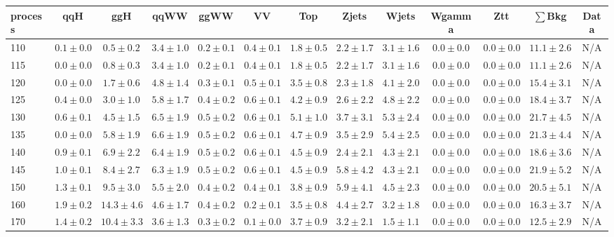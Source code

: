 \begin{table}
{%
 \tiny
 \begin{center}
 \begin{tabular}{l | c c | c c c c c c c c  | c c}
 \hline
 process & qqH & ggH & qqWW & ggWW & VV & Top & Zjets & Wjets & Wgamma & Ztt & $\sum$Bkg & Data \\
 \hline
110 & $0.1\pm0.0$ & $0.5\pm0.2$ & $3.4\pm1.0$ & $0.2\pm0.1$ & $0.4\pm0.1$ & $1.8\pm0.5$ & $2.2\pm1.7$ & $3.1\pm1.6$ & $0.0\pm0.0$ & $0.0\pm0.0$ & $11.1\pm2.6$ & N/A \\
115 & $0.0\pm0.0$ & $0.8\pm0.3$ & $3.4\pm1.0$ & $0.2\pm0.1$ & $0.4\pm0.1$ & $1.8\pm0.5$ & $2.2\pm1.7$ & $3.1\pm1.6$ & $0.0\pm0.0$ & $0.0\pm0.0$ & $11.1\pm2.6$ & N/A \\
120 & $0.0\pm0.0$ & $1.7\pm0.6$ & $4.8\pm1.4$ & $0.3\pm0.1$ & $0.5\pm0.1$ & $3.5\pm0.8$ & $2.3\pm1.8$ & $4.1\pm2.0$ & $0.0\pm0.0$ & $0.0\pm0.0$ & $15.4\pm3.1$ & N/A \\
125 & $0.4\pm0.0$ & $3.0\pm1.0$ & $5.8\pm1.7$ & $0.4\pm0.2$ & $0.6\pm0.1$ & $4.2\pm0.9$ & $2.6\pm2.2$ & $4.8\pm2.2$ & $0.0\pm0.0$ & $0.0\pm0.0$ & $18.4\pm3.7$ & N/A \\
130 & $0.6\pm0.1$ & $4.5\pm1.5$ & $6.5\pm1.9$ & $0.5\pm0.2$ & $0.6\pm0.1$ & $5.1\pm1.0$ & $3.7\pm3.1$ & $5.3\pm2.4$ & $0.0\pm0.0$ & $0.0\pm0.0$ & $21.7\pm4.5$ & N/A \\
135 & $0.0\pm0.0$ & $5.8\pm1.9$ & $6.6\pm1.9$ & $0.5\pm0.2$ & $0.6\pm0.1$ & $4.7\pm0.9$ & $3.5\pm2.9$ & $5.4\pm2.5$ & $0.0\pm0.0$ & $0.0\pm0.0$ & $21.3\pm4.4$ & N/A \\
140 & $0.9\pm0.1$ & $6.9\pm2.2$ & $6.4\pm1.9$ & $0.5\pm0.2$ & $0.6\pm0.1$ & $4.5\pm0.9$ & $2.4\pm2.1$ & $4.3\pm2.1$ & $0.0\pm0.0$ & $0.0\pm0.0$ & $18.6\pm3.6$ & N/A \\
145 & $1.0\pm0.1$ & $8.4\pm2.7$ & $6.3\pm1.9$ & $0.5\pm0.2$ & $0.6\pm0.1$ & $4.5\pm0.9$ & $5.8\pm4.2$ & $4.3\pm2.1$ & $0.0\pm0.0$ & $0.0\pm0.0$ & $21.9\pm5.2$ & N/A \\
150 & $1.3\pm0.1$ & $9.5\pm3.0$ & $5.5\pm2.0$ & $0.4\pm0.2$ & $0.4\pm0.1$ & $3.8\pm0.9$ & $5.9\pm4.1$ & $4.5\pm2.3$ & $0.0\pm0.0$ & $0.0\pm0.0$ & $20.5\pm5.1$ & N/A \\
160 & $1.9\pm0.2$ & $14.3\pm4.6$ & $4.6\pm1.7$ & $0.4\pm0.2$ & $0.2\pm0.1$ & $3.5\pm0.8$ & $4.4\pm2.7$ & $3.2\pm1.8$ & $0.0\pm0.0$ & $0.0\pm0.0$ & $16.3\pm3.7$ & N/A \\
170 & $1.4\pm0.2$ & $10.4\pm3.3$ & $3.6\pm1.3$ & $0.3\pm0.2$ & $0.1\pm0.0$ & $3.7\pm0.9$ & $3.2\pm2.1$ & $1.5\pm1.1$ & $0.0\pm0.0$ & $0.0\pm0.0$ & $12.5\pm2.9$ & N/A \\

\end{tabular}
\end{center}}
\end{table}
